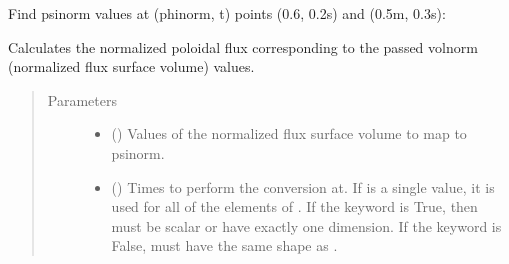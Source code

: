 \documentclass[letterpaper,10pt,english]{sphinxmanual}
\begin{document}
\begin{fulllineitems}
\begin{fulllineitems}
Find psinorm values at (phinorm, t) points (0.6, 0.2s) and (0.5m, 0.3s):

\begin{sphinxVerbatim}[commandchars=\\\{\}]
   \PYG{p}{[} \PYG{p}{]} \PYG{p}{[} \PYG{p}{]} 
\end{sphinxVerbatim}

\end{fulllineitems}


\begin{fulllineitems}
\label{\detokenize{eqtools:eqtools.core.Equilibrium.volnorm2psinorm}}
Calculates the normalized poloidal flux corresponding to the passed volnorm (normalized flux surface volume) values.
\begin{quote}\begin{description}
\item[{Parameters}] \leavevmode\begin{itemize}
\item {} 
 () \textendash{} Values of the normalized
flux surface volume to map to psinorm.

\item {} 
 () \textendash{} Times to perform the conversion at.
If  is a single value, it is used for all of the elements of
. If the  keyword is True, then  must be scalar
or have exactly one dimension. If the  keyword is False,
 must have the same shape as .


\end{itemize}
\end{description}
\end{quote}
\end{fulllineitems}
\end{fulllineitems}
\end{document}
